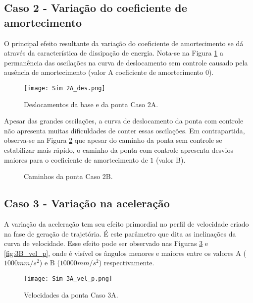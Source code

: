 \subsection{Caso 2 - Variação do coeficiente de amortecimento}
O principal efeito resultante da variação do coeficiente de amortecimento se dá através da característica de dissipação de energia. Nota-se na Figura \ref{fig:2A_des} a permanência das oscilações na curva de deslocamento sem controle causado pela ausência de amortecimento (valor A coeficiente de amortecimento \(0\)).

\begin{figure}[H]
    \centering
    \caption{Deslocamentos da base e da ponta Caso 2A.}
    \texttt{[image: Sim 2A\_des.png]}

    \label{fig:2A_des}
\end{figure}

Apesar das grandes oscilações, a curva de deslocamento da ponta com controle não apresenta muitas dificuldades de conter essas oscilações. Em contrapartida, observa-se na Figura \ref{fig:2B_cam_p_s} que apesar do caminho da ponta sem controle se estabilizar mais rápido, o caminho da ponta com controle apresenta desvios maiores para o coeficiente de amortecimento de \(1\) (valor B).

\begin{figure}[H]
    \centering
    \hfill
    \caption{Caminhos da ponta Caso 2B.}
    \label{fig:2B_cam_p_s}
\end{figure}

\subsection{Caso 3 - Variação na aceleração}
A variação da aceleração tem seu efeito primordial no perfil de velocidade criado na fase de geração de trajetória. É este parâmetro que dita as inclinações da curva de velocidade. Esse efeito pode ser observado nas Figuras \ref{fig:3A_vel_p} e \ref{fig:3B_vel_p}, onde é visível os ângulos menores e maiores entre os valores A (\(1000 mm/s^2\)) e B (\(10000 mm/s^2\)) respectivamente.

\begin{figure}[H]
    \centering
    \caption{Velocidades da ponta Caso 3A.}
    \texttt{[image: Sim 3A\_vel\_p.png]}

    \label{fig:3A_vel_p}
\end{figure}

